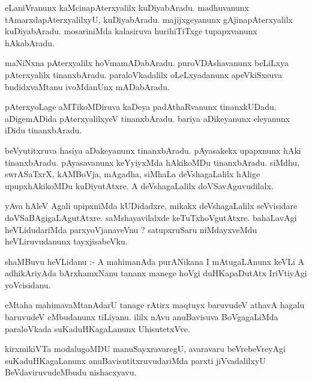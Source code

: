 \documentclass{article}
\begin{document}
\begin{mn}
eLaniVranunx  kaMcinapAterxyalilx  kuDiyabAradu.  madhuvanunx  tAmarxdapAterxyalilxyU,  kuDiyabAradu.  
majijxgeyanunx  gAjinapAterxyalilx  kuDiyabAradu.  mosariniMda  kalasiruva  hurihiTiTxge  tupapxvanunx  hAkabAradu.
\end{mn}

\begin{mn}
maNiNxna  pAterxyalilx  hoVmamADabAradu.  puroVDAshavanunx  beLiLxya  pAterxyalilx  tinanxbAradu.  
paraloVkadalilx  oLeLxyadanunx  apeVkiSxsuva  budidxvaMtanu  ivoMdanUnx  mADabAradu.
\end{mn}

\begin{mn}
pAterxyoLage  aMTikoMDiruva  kaDeya  padAthaRvanunx  tinanxkUDadu.  aDigemADida  pAterxyalilxyeV  tinanxbAradu.  
bariya  aDikeyanunx  eleyanunx  iDidu  tinanxbAradu.
\end{mn}

\begin{mn}
beVyutitxruva  hasiya  aDakeyanunx  tinanxbAradu.  pAyasakekx  upapxnunx  hAki  tinanxbAradu.  pAyasavanunx  
keYyiyxMda  hAkikoMDu  tinanxbAradu.  siMdhu,  swrASaTxrX,  kAMBoVja,  mAgadha,  siMhaLa  deVshagaLalilx  
hAlige  upupxhAkikoMDu  kuDiyutAtxre.  A  deVshagaLalilx  doVSavAguvudilalx.
\end{mn}

\begin{mn}
yAva  hAleV  Agali  upipxniMda  kUDidadxre,  mikakx  deVshagaLalilx  seVvisidare  doVSaBAgigaLAgutAtxre.  
saMshayavilalxde  keTuTxhoVgutAtxre.  bahaLavAgi  heVLidudariMda  parxyoVjanaveVnu ?  satupxruSaru  
niMdayxveMdu  heVLiruvudanunx  tayxjisabeVku.
\end{mn}

\begin{mn}
shaMBuvu  heVLidanu :- A  mahimanAda  purANikana  I  mAtugaLAnunx  keVLi  A  adhikAriyAda  bArxhamxNanu  
tananx  manege  hoVgi  duHKapaDutAtx  IriVtiyAgi  yoVcisidanu.
\end{mn}

\begin{mn}
eMtaha  mahimavaMtanAdarU  tanage  rAtirx  maqtuyx  baruvudeV  athavA  hagalu  baruvudeV  eMbudanunx  tiLiyanu.  
ililx  nAvu  anuBavisuva  BoVgagaLiMda  paraloVkada  suKaduHKagaLanunx  UhisutetxVve.
\end{mn}

\begin{mn}
kirxmikiVTa  modalugoMDU  manuSayxravaregU,  avaravaru  beVrebeVreyAgi  suKaduHKagaLanunx  anuBavisutitxruvudariMda  
parxti  jiVvadalilxyU  BeVdaviruvudeMbudu  nishacxyavu.  
\end{mn}
\end{document}
